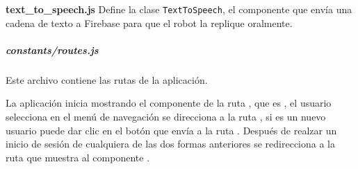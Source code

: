 \textbf{text\_to\_speech.js}
\label{\detokenize{code_docs:text-to-speech-js}}
Define la clase \texttt{TextToSpeech}, el componente que envía una cadena de texto a Firebase para que el robot la
replique oralmente.

\subparagraph{constants/routes.js}
\label{\detokenize{code_docs:constants}}

Este archivo contiene las rutas de la aplicación.

%
\begin{sphinxVerbatim}[commandchars=\\\{\}]
    
    
    
    
\end{sphinxVerbatim}


La aplicación inicia mostrando el componente de la ruta , que es
, el usuario selecciona  en el menú de navegación
se direcciona a la ruta , si es un nuevo usuario puede dar clic
en el botón que envía a la ruta . Después de realzar un inicio de
sesión de cualquiera de las dos formas anteriores se redirecciona a la ruta
 que muestra al componente .


